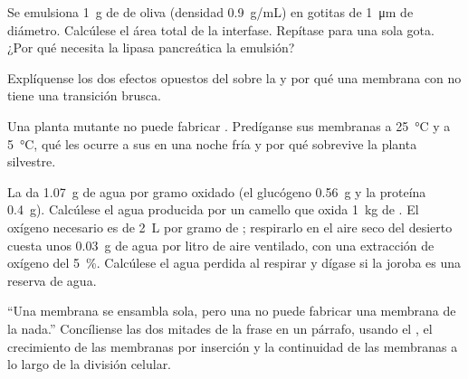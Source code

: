 \begin{exercise}[$\star\star$]\label{exo:b1:lipids:8}
Se emulsiona \qty{1}{g} de  de oliva (densidad \qty{0.9}{g/mL}) en
gotitas de \qty{1}{\micro m} de diámetro. Calcúlese el área total de la
interfase. Repítase para una sola gota. ¿Por qué necesita la lipasa
pancreática la emulsión?
\end{exercise}

\begin{exercise}[$\star\star$]\label{exo:b1:lipids:9}
Explíquense los dos efectos opuestos del  sobre la  y por qué una membrana con  no tiene una transición
brusca.
\end{exercise}

\begin{exercise}[$\star\star\star$]\label{exo:b1:lipids:10}
Una planta mutante no puede fabricar . Predíganse
sus membranas a \qty{25}{\celsius} y a \qty{5}{\celsius}, qué les ocurre a
sus  en una noche fría y por qué sobrevive la planta silvestre.
\end{exercise}

\begin{exercise}[$\star\star\star$]\label{exo:b1:lipids:11}
La  da \qty{1.07}{g} de agua por gramo oxidado (el glucógeno
\qty{0.56}{g} y la proteína \qty{0.4}{g}). Calcúlese el agua producida por
un camello que oxida \qty{1}{kg} de . El oxígeno necesario es de
\qty{2}{L} por gramo de ; respirarlo en el aire seco del desierto
cuesta unos \qty{0.03}{g} de agua por litro de aire ventilado, con una
extracción de oxígeno del \qty{5}{\%}. Calcúlese el agua perdida al respirar
y dígase si la joroba es una reserva de agua.
\end{exercise}

\begin{exercise}[$\star\star\star$]\label{exo:b1:lipids:12}
``Una membrana se ensambla sola, pero una  no puede fabricar una
membrana de la nada.'' Concíliense las dos mitades de la frase en un
párrafo, usando el , el crecimiento de las membranas por
inserción y la continuidad de las membranas a lo largo de la división
celular.
\end{exercise}

